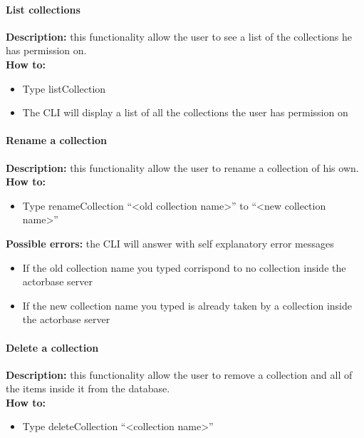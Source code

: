 \documentclass{scalatekids-article}
\begin{document}
\paragraph{List collections}
\label{sec:listcollection}
\textbf{Description:} this functionality allow the user to see a list of 
the collections he has permission on.\\
\textbf{How to:} 
\begin{itemize}
	\item Type listCollection
	\item The CLI will display a list of all the collections the user has 
	permission on
\end{itemize}

\paragraph{Rename a collection}
\label{sec:renamecollection}
\textbf{Description:} this functionality allow the user to rename a 
collection of his own.\\
\textbf{How to:} 
\begin{itemize}
	\item Type renameCollection ``<old collection name>'' to ``<new collection name>''
\end{itemize}
\textbf{Possible errors:} the CLI will answer with self explanatory error messages 
\begin{itemize}
	\item If the old collection name you typed corrispond to no collection inside the actorbase server
	\item If the new collection name you typed is already taken by a collection inside the actorbase server 
\end{itemize}

\paragraph{Delete a collection}
\label{sec:deletecollection}
\textbf{Description:} this functionality allow the user to remove a collection and all of the items inside it from the database.\\
\textbf{How to:} 
\begin{itemize}
	\item Type deleteCollection ``<collection name>''
\end{itemize}
\end{document}
